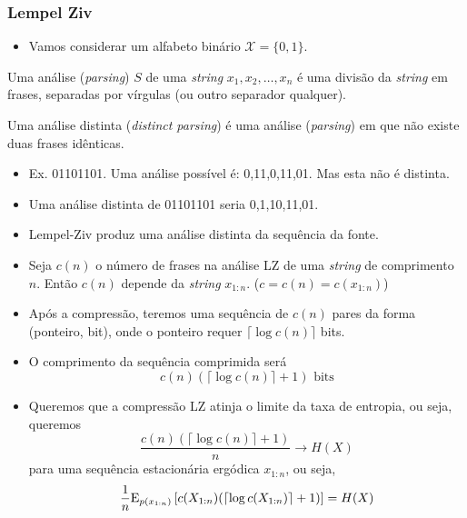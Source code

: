 \begin{frame}[allowframebreaks]
  \frametitle{Lempel Ziv}
  \begin{itemize}
  \item Vamos considerar um alfabeto binário $\mathcal{X} = \{0,1\}$.
  \end{itemize}

  \begin{definition}
  Uma análise (\textit{parsing}) $S$ de uma \textit{string} $x_1,x_2, \ldots, x_n$ é
  uma divisão da \textit{string} em frases, separadas por vírgulas (ou outro separador qualquer).
  \end{definition}

  \begin{definition}
  Uma análise distinta (\textit{distinct parsing}) é uma análise (\textit{parsing})
  em que não existe duas frases idênticas.
  \end{definition}

  \begin{itemize}
  \item Ex. 01101101. Uma análise possível é: 0,11,0,11,01. Mas esta não é distinta.
  \item Uma análise distinta de 01101101 seria 0,1,10,11,01.
  \item Lempel-Ziv produz uma análise distinta da sequência da fonte.

  \item Seja $c(n)$ o número de frases na análise LZ de uma \textit{string} de comprimento $n$.
	Então $c(n)$ depende da \textit{string} $x_{1:n}$. ($c=c(n)=c(x_{1:n})$)
  \item Após a compressão, teremos uma sequência de $c(n)$ pares da forma (ponteiro, bit),
	onde o ponteiro requer $\lceil \log c(n) \rceil$ bits.
  \item O comprimento da sequência comprimida será
	\begin{equation}
	c(n) ( \lceil \log c(n) \rceil + 1 ) \text{ bits}
	\end{equation}
  \item Queremos que a compressão LZ atinja o limite da taxa de entropia, ou seja,
	queremos
	\begin{equation}
	\frac{c(n) ( \lceil \log c(n) \rceil + 1 )}{n} \rightarrow H(X)
	\end{equation}
	para uma sequência estacionária ergódica $x_{1:n}$, ou seja,
	\begin{equation}
	\frac{1}{n} \mathrm{E}_{p(x_{1:n})} \left[ c(X_{1:n}) (\lceil \log c(X_{1:n}) \rceil + 1) \right]  = H(X)
	\end{equation}
  \end{itemize}

\end{frame}


